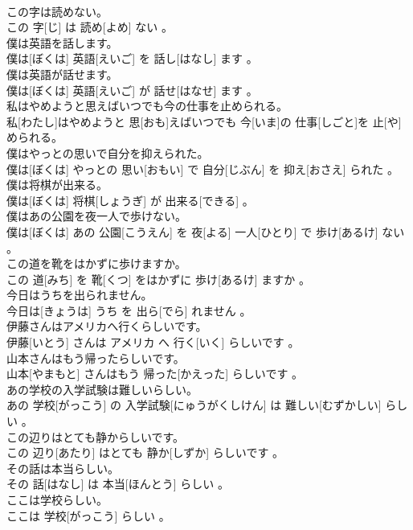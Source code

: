 \documentclass[8pt]{extreport}
\begin{document}
\begin{CJK}{UTF8}{min}
\\	この字は読めない。	
\\	この 字[じ] は 読め[よめ] ない 。
\\	僕は英語を話します。	
\\	僕は[ぼくは] 英語[えいご] を 話し[はなし] ます 。
\\	僕は英語が話せます。	
\\	僕は[ぼくは] 英語[えいご] が 話せ[はなせ] ます 。
\\	私はやめようと思えばいつでも今の仕事を止められる。	
\\	私[わたし]はやめようと 思[おも]えばいつでも 今[いま]の 仕事[しごと]を 止[や]められる。
\\	僕はやっとの思いで自分を抑えられた。	
\\	僕は[ぼくは] やっとの 思い[おもい] で 自分[じぶん] を 抑え[おさえ] られた 。
\\	僕は将棋が出来る。	
\\	僕は[ぼくは] 将棋[しょうぎ] が 出来る[できる] 。
\\	僕はあの公園を夜一人で歩けない。	
\\	僕は[ぼくは] あの 公園[こうえん] を 夜[よる] 一人[ひとり] で 歩け[あるけ] ない 。
\\	この道を靴をはかずに歩けますか。	
\\	この 道[みち] を 靴[くつ] をはかずに 歩け[あるけ] ますか 。
\\	今日はうちを出られません。	
\\	今日は[きょうは] うち を 出ら[でら] れません 。
\\	伊藤さんはアメリカへ行くらしいです。	
\\	伊藤[いとう] さんは アメリカ へ 行く[いく] らしいです 。
\\	山本さんはもう帰ったらしいです。	
\\	山本[やまもと] さんはもう 帰った[かえった] らしいです 。
\\	あの学校の入学試験は難しいらしい。	
\\	あの 学校[がっこう] の 入学試験[にゅうがくしけん] は 難しい[むずかしい] らしい 。
\\	この辺りはとても静からしいです。	
\\	この 辺り[あたり] はとても 静か[しずか] らしいです 。
\\	その話は本当らしい。	
\\	その 話[はなし] は 本当[ほんとう] らしい 。
\\	ここは学校らしい。	
\\	ここは 学校[がっこう] らしい 。

\end{CJK}
\end{document}
